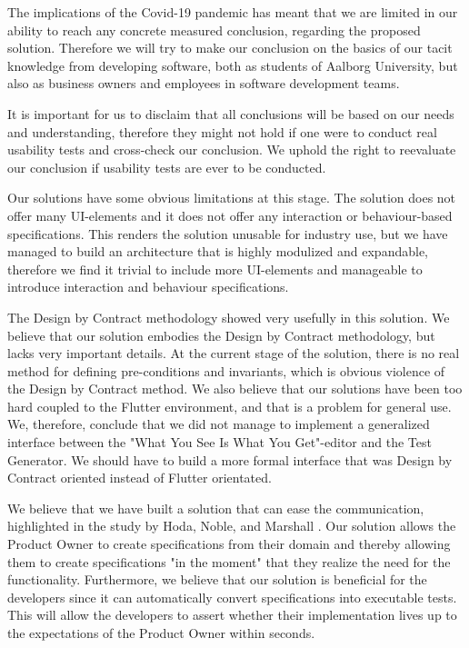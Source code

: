 The implications of the Covid-19 pandemic has meant that we are limited in our ability to reach any concrete measured conclusion, regarding the proposed solution.
Therefore we will try to make our conclusion on the basics of our tacit knowledge from developing software, both as students of Aalborg University, but also as business owners and employees in software development teams.

It is important for us to disclaim that all conclusions will be based on our needs and understanding, therefore they might not hold if one were to conduct real usability tests and cross-check our conclusion.
We uphold the right to reevaluate our conclusion if usability tests are ever to be conducted.

Our solutions have some obvious limitations at this stage.
The solution does not offer many UI-elements and it does not offer any interaction or behaviour-based specifications.
This renders the solution unusable for industry use, but we have managed to build an architecture that is highly modulized and expandable, therefore we find it trivial to include more UI-elements and manageable to introduce interaction and behaviour specifications.

The Design by Contract methodology showed very usefully in this solution.
We believe that our solution embodies the Design by Contract methodology, but lacks very important details.
At the current stage of the solution, there is no real method for defining pre-conditions and invariants, which is obvious violence of the Design by Contract method.
We also believe that our solutions have been too hard coupled to the Flutter environment, and that is a problem for general use. 
We, therefore, conclude that we did not manage to implement a generalized interface between the "What You See Is What You Get"-editor and the Test Generator.
We should have to build a more formal interface that was Design by Contract oriented instead of Flutter orientated.

We believe that we have built a solution that can ease the communication, highlighted in the study by Hoda, Noble, and Marshall \cite{Hoda2011TheIO}. 
Our solution allows the Product Owner to create specifications from their domain and thereby allowing them to create specifications "in the moment" that they realize the need for the functionality.
Furthermore, we believe that our solution is beneficial for the developers since it can automatically convert specifications into executable tests.
This will allow the developers to assert whether their implementation lives up to the expectations of the Product Owner within seconds.